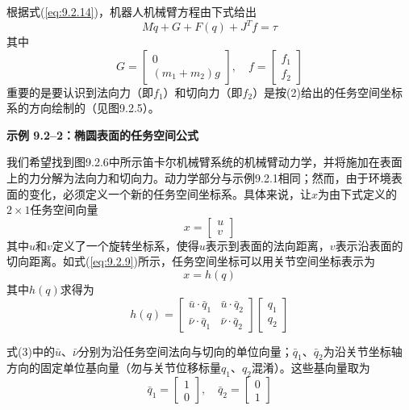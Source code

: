 \documentclass[12pt,a4paper]{ctexart}
\begin{document}
根据式(\ref{eq:9.2.14})，机器人机械臂方程由下式给出
\begin{equation}
M\ddot{q} + G + F(q) + J^T f = \tau
\end{equation}
其中
\[
G = \begin{bmatrix} 0 \\ (m_1+m_2)g \end{bmatrix}, \quad f = \begin{bmatrix} f_1 \\ f_2 \end{bmatrix}
\]
重要的是要认识到法向力（即$f_1$）和切向力（即$f_2$）是按(2)给出的任务空间坐标系的方向绘制的（见图9.2.5）。

\textbf{示例 9.2--2：椭圆表面的任务空间公式}

我们希望找到图9.2.6中所示笛卡尔机械臂系统的机械臂动力学，并将施加在表面上的力分解为法向力和切向力。动力学部分与示例9.2.1相同；然而，由于环境表面的变化，必须定义一个新的任务空间坐标系。具体来说，让$x$为由下式定义的$2 \times 1$任务空间向量
\begin{equation}
x = \begin{bmatrix} u \\ v \end{bmatrix}
\end{equation}
其中$u$和$v$定义了一个旋转坐标系，使得$u$表示到表面的法向距离，$v$表示沿表面的切向距离。如式(\ref{eq:9.2.9})所示，任务空间坐标可以用关节空间坐标表示为
\begin{equation}
x = h(q)
\end{equation}
其中$h(q)$求得为
\begin{equation}\tag{3}
h(q) = \begin{bmatrix} \bar{u} \cdot \bar{q}_1 & \bar{u} \cdot \bar{q}_2 \\ \bar{\nu} \cdot \bar{q}_1 & \bar{\nu} \cdot \bar{q}_2 \end{bmatrix} \begin{bmatrix} q_1 \\ q_2 \end{bmatrix}
\end{equation}

式(3)中的$\bar{u}$、$\bar{\nu}$分别为沿任务空间法向与切向的单位向量；$\bar{q}_1$、$\bar{q}_2$为沿关节坐标轴方向的固定单位基向量（勿与关节位移标量$q_1$、$q_2$混淆）。这些基向量取为
\begin{equation}\tag{4}
\bar{q}_1 = \begin{bmatrix} 1 \\ 0 \end{bmatrix}, \quad \bar{q}_2 = \begin{bmatrix} 0 \\ 1 \end{bmatrix}
\end{equation}
\end{document}
